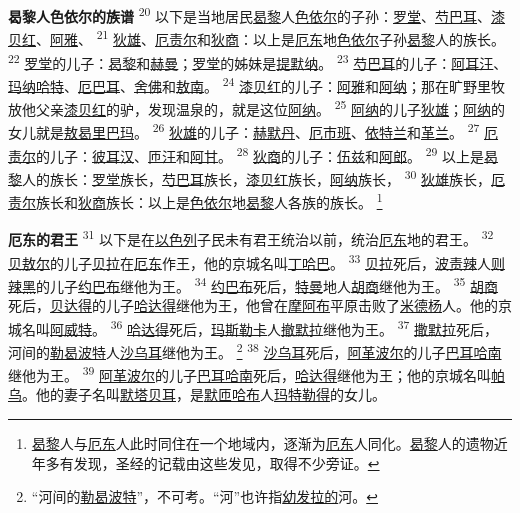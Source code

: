 \textbf{曷黎人色依尔的族谱\quad}
\textsuperscript{20}
以下是当地居民\uline{曷黎}人\uline{色依尔}的子孙：\uline{罗堂}、\uline{芍巴耳}、\uline{漆贝红}、\uline{阿雅}、
\textsuperscript{21}
\uline{狄雄}、\uline{厄责尔}和\uline{狄商}：以上是\uline{厄东}地\uline{色依尔}子孙\uline{曷黎}人的族长。
\textsuperscript{22}
\uline{罗堂}的儿子：\uline{曷黎}和\uline{赫曼}；\uline{罗堂}的姊妹是\uline{提默纳}。
\textsuperscript{23}
\uline{芍巴耳}的儿子：\uline{阿耳汪}、\uline{玛纳哈特}、\uline{厄巴耳}、\uline{舍佛}和\uline{敖南}。
\textsuperscript{24}
\uline{漆贝红}的儿子：\uline{阿雅}和\uline{阿纳}；那在旷野里牧放他父亲\uline{漆贝红}的驴，发现温泉的，就是这位\uline{阿纳}。
\textsuperscript{25}
\uline{阿纳}的儿子\uline{狄雄}；\uline{阿纳}的女儿就是\uline{敖曷里}\uline{巴玛}。
\textsuperscript{26}
\uline{狄雄}的儿子：\uline{赫默丹}、\uline{厄市班}、\uline{依特兰}和\uline{革兰}。
\textsuperscript{27}
\uline{厄责尔}的儿子：\uline{彼耳汉}、\uline{匝汪}和\uline{阿甘}。
\textsuperscript{28}
\uline{狄商}的儿子：\uline{伍兹}和\uline{阿郎}。
\textsuperscript{29}
以上是\uline{曷黎}人的族长：\uline{罗堂}族长，\uline{芍巴耳}族长，\uline{漆贝红}族长，\uline{阿纳}族长，
\textsuperscript{30}
\uline{狄雄}族长，\uline{厄责尔}族长和\uline{狄商}族长：以上是\uline{色依尔}地\uline{曷黎}人各族的族长。
\footnote{\uline{曷黎}人与\uline{厄东}人此时同住在一个地域内，逐渐为\uline{厄东}人同化。\uline{曷黎}人的遗物近年多有发现，圣经的记载由这些发见，取得不少旁证。}

\textbf{厄东的君王\quad}
\textsuperscript{31}
以下是在\uline{以色列}子民未有君王统治以前，统治\uline{厄东}地的君王。
\textsuperscript{32}
\uline{贝敖尔}的儿子\uline{贝拉}在\uline{厄东}作王，他的京城名叫\uline{丁哈巴}。
\textsuperscript{33}
\uline{贝拉}死后，\uline{波责辣}人\uline{则辣黑}的儿子\uline{约巴布}继他为王。
\textsuperscript{34}
\uline{约巴布}死后，\uline{特曼}地人\uline{胡商}继他为王。
\textsuperscript{35}
\uline{胡商}死后，\uline{贝达得}的儿子\uline{哈达得}继他为王，他曾在\uline{摩阿布}平原击败了\uline{米德杨}人。他的京城名叫\uline{阿威特}。
\textsuperscript{36}
\uline{哈达得}死后，\uline{玛斯}\uline{勒卡}人\uline{撤默拉}继他为王。
\textsuperscript{37}
\uline{撒默拉}死后，河间的\uline{勒曷波特}人\uline{沙乌耳}继他为王。
\footnote{“河间的\uline{勒曷波特}”，不可考。“河”也许指\uline{幼发拉的}河。}
\textsuperscript{38}
\uline{沙乌耳}死后，\uline{阿革}\uline{波尔}的儿子\uline{巴耳}\uline{哈南}继他为王。
\textsuperscript{39}
\uline{阿革}\uline{波尔}的儿子\uline{巴耳}\uline{哈南}死后，\uline{哈达得}继他为王；他的京城名叫\uline{帕乌}。他的妻子名叫\uline{默塔贝耳}，是\uline{默匝}\uline{哈布}人\uline{玛特}\uline{勒得}的女儿。

